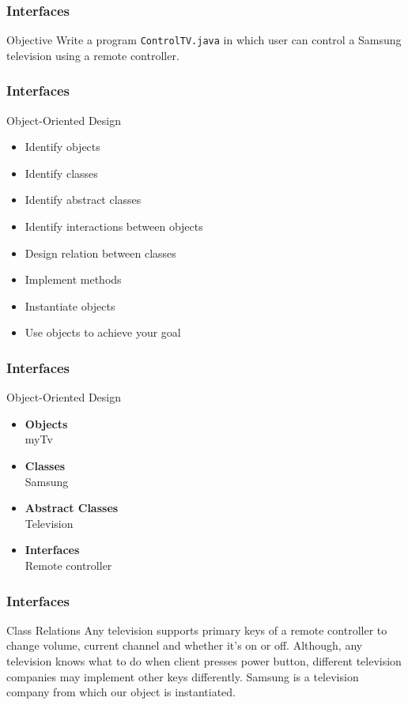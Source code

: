 \documentclass[10pt, compress]{beamer}
\begin{document}
\begin{frame}[fragile]
  \frametitle{Interfaces}
  \begin{block}{Objective}
    Write a program \texttt{ControlTV.java} in which user can control a Samsung television using a remote controller.
  \end{block}
\end{frame}

\begin{frame}[fragile]
  \frametitle{Interfaces}
  \begin{block}{Object-Oriented Design}
    \begin{itemize}
      \item[] Identify objects
      \item[] Identify classes
      \item[] Identify abstract classes
      \item[] Identify interactions between objects
      \item[] Design relation between classes
      \item[] Implement methods
      \item[] Instantiate objects
      \item[] Use objects to achieve your goal
    \end{itemize}
  \end{block}
\end{frame}

\begin{frame}[fragile]
  \frametitle{Interfaces}
  \begin{block}{Object-Oriented Design}
    \begin{itemize}
      \item[] \textbf{Objects}\\myTv
      \item[] \textbf{Classes}\\Samsung
      \item[] \textbf{Abstract Classes}\\Television
      \item[] \textbf{Interfaces}\\Remote controller
    \end{itemize}
  \end{block}
\end{frame}

\begin{frame}[fragile]
  \frametitle{Interfaces}
  \begin{block}{Class Relations}
    Any television supports primary keys of a remote controller to change volume, current channel and whether it's on or off.
    Although, any television knows what to do when client presses power button, different television companies may implement other keys differently.
    Samsung is a television company from which our object is instantiated.
  \end{block}
\end{frame}
\end{document}
